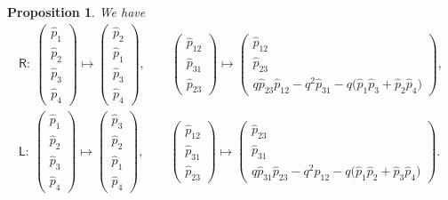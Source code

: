 \documentclass[10pt,a4paper]{amsart}
\numberwithin{equation}{section}
\newtheorem{Proposition}[Theorem]{Proposition}
 { \theoremstyle{definition}
\newtheorem{Definition}[Theorem]{Definition}
\newtheorem{Note}[Theorem]{Note}
\newtheorem{Example}[Theorem]{Example}
\newtheorem{Remark}[Theorem]{Remark} }
\begin{document}
\begin{Proposition} We have
 \begin{gather}
 \mathsf{R}\colon \
 \left( \begin{matrix}
 \hat{p}_1 \\
 \hat{p}_2 \\
 \hat{p}_3 \\
 \hat{p}_4
 \end{matrix} \right)
 \mapsto
 \left( \begin{matrix}
 \hat{p}_2 \\
 \hat{p}_1 \\
 \hat{p}_3 \\
 \hat{p}_4
 \end{matrix}
 \right), \qquad
 \left( \begin{matrix}
 \hat{p}_{12} \\
 \hat{p}_{31} \\
 \hat{p}_{23}
 \end{matrix} \right)
 \mapsto
 \left( \begin{matrix}
 \hat{p}_{12} \\
 \hat{p}_{23} \\
 q \hat{p}_{23} \hat{p}_{12} - q^2 \hat{p}_{31} - q \big( \hat{p}_1 \hat{p}_3 + \hat{p}_2 \hat{p}_4 \big)
 \end{matrix} \right) , \nonumber\\
 \mathsf{L}\colon \
 \left( \begin{matrix}
 \hat{p}_1 \\
 \hat{p}_2 \\
 \hat{p}_3 \\
 \hat{p}_4
 \end{matrix} \right)
 \mapsto
 \left( \begin{matrix}
 \hat{p}_3 \\
 \hat{p}_2 \\
 \hat{p}_1 \\
 \hat{p}_4
 \end{matrix} \right) ,
 \qquad
 \left( \begin{matrix}
 \hat{p}_{12} \\
 \hat{p}_{31} \\
 \hat{p}_{23}
 \end{matrix} \right)
 \mapsto
 \left( \begin{matrix}
 \hat{p}_{23} \\
 \hat{p}_{31} \\
 q \hat{p}_{31} \hat{p}_{23} - q^2 \hat{p}_{12} - q \big( \hat{p}_1 \hat{p}_2 + \hat{p}_3 \hat{p}_4 \big)
 \end{matrix} \right) . \label{RL_qp}
 \end{gather}
\end{Proposition}
\end{document}
